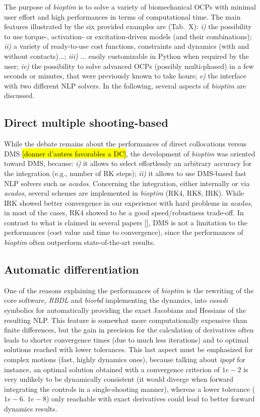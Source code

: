 The purpose of \textit{bioptim} is to solve a variety of biomechanical OCPs with minimal user effort and high performances in terms of computational time. 
The main features illustrated by the six provided examples are (Tab.~X): 
\textit{i)} the possibility to use torque-, activation- or excitation-driven models (and their combinations);
\textit{ii)} a variety of ready-to-use cost functions, constraints and dynamics (with and without contacts)...;
\textit{iii)} ... easily customizable in Python when required by the user;
\textit{iv)} the possibility to solve advanced OCPs (possibly multi-phased) in a few seconds or minutes, that were previously known to take hours; 
\textit{v)} the interface with two different NLP solvers.
In the following, several aspects of \textit{bioptim} are discussed.

\subsection{Direct multiple shooting-based}

While the debate remains about the performances of direct collocations versus DMS \cite{diehl2006fast}\hl{[donner d'autres favorables a DC]}, the development of \textit{bioptim} was oriented toward DMS, because: \textit{i)} it allows to select effortlessly an arbitrary accuracy for the integration (e.g., number of RK steps); \textit{ii)} it allows to use DMS-based fast NLP solvers such as \textit{acados}.
Concerning the integration, either internally or via \textit{acados}, several schemes are implemented in \textit{bioptim} (RK4, RK8, IRK).
While IRK showed better convergence in our experience with hard problems in \textit{acados}, in most of the cases, RK4 showed to be a good speed/robustness trade-off. 
In contrast to what is claimed in several papers [\addref], DMS is not a limitation to the performances (cost value and time to convergence), since the performances of \textit{bioptim} often outperform state-of-the-art results.

\subsection{Automatic differentiation}

One of the reasons explaining the performances of \textit{bioptim} is the rewriting of the core software, \textit{RBDL} and \textit{biorbd} implementing the dynamics, into \textit{casadi} symbolics for automatically providing the exact Jacobians and Hessians of the resulting NLP.  
This feature is somewhat more computationally expensive than finite differences, but the gain in precision for the calculation of derivatives often leads to shorter convergence times (due to much less iterations) and to optimal solutions reached with lower tolerances.
This last aspect must be emphasized for complex motions (fast, highly dynamics ones), because talking about \textit{ipopt} for instance, an optimal solution obtained with a convergence criterion of $1e-2$ is very unlikely to be dynamically consistent (it would diverge when forward integrating the controls in a single-shooting manner), whereas a lower tolerance ($1e-6$. $1e-8$) only reachable with exact derivatives could lead to better forward dynamics results.

